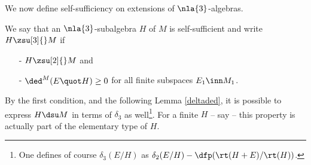 \medskip
We now define self-sufficiency on extensions of $\nla{3}$-algebras.
\begin{dfn}\label{trestrongness}
We say that an $\nla{3}$-subalgebra $H$ of $M$ is self-sufficient and write $H\zsu[3]{}M$ if
\begin{itemize}
\item[-] $H\zsu[2]{}M$ and
\item[-] $\ded^{M}(E\quot H)\geq0$ for all finite subspaces $E_{1}\inn M_{1}$.
\end{itemize}
By the first condition, and the following Lemma \ref{deltaded}, it is possible to express
$H\dsu M$ in terms of $\delta_{3}$ as well\footnote{
One defines of course $\delta_{3}(E/H)$ as $\delta_{2}(E/H)-\dfp(\rt(H+E)/\rt(H))$.}.
For a finite $H$ -- say -- this property is
actually part of the elementary type of $H$.
\end{dfn}